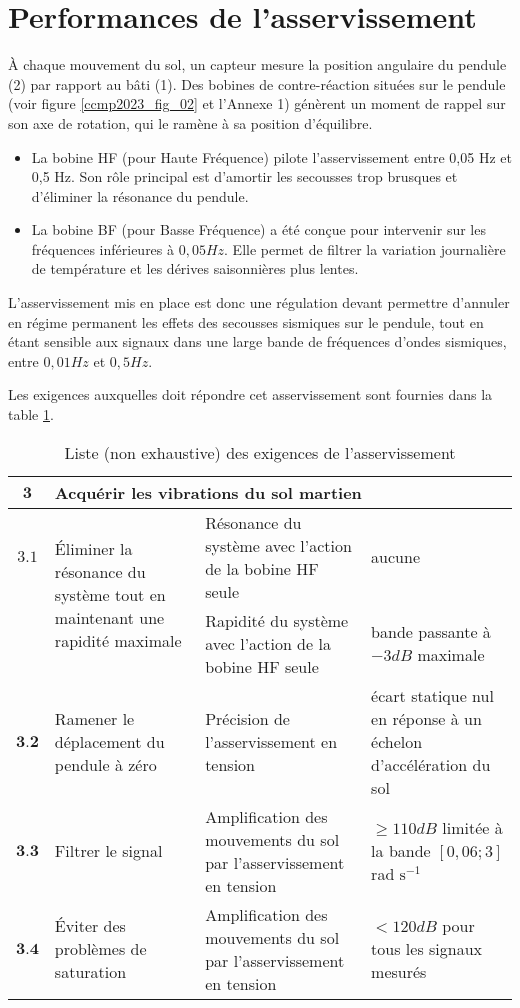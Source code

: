 \section{Performances de l'asservissement}
À chaque mouvement du sol, un capteur mesure la position angulaire du pendule (2) par rapport au bâti (1). Des bobines de contre-réaction situées sur le pendule (voir figure \ref{ccmp2023_fig_02} et l'Annexe 1) génèrent un moment de rappel sur son axe de rotation, qui le ramène à sa position d'équilibre.

\begin{itemize}
  \item La bobine HF (pour Haute Fréquence) pilote l'asservissement entre 0,05 Hz et 0,5 Hz. Son rôle principal est d'amortir les secousses trop brusques et d'éliminer la résonance du pendule.
  \item La bobine BF (pour Basse Fréquence) a été conçue pour intervenir sur les fréquences inférieures à $0,05 \si{Hz}$. Elle permet de filtrer la variation journalière de température et les dérives saisonnières plus lentes.
\end{itemize}

L'asservissement mis en place est donc une régulation devant permettre d'annuler en régime permanent les effets des secousses sismiques sur le pendule, tout en étant sensible aux signaux dans une large bande de fréquences d'ondes sismiques, entre $0,01 \si{Hz}$ et $0,5 \si{Hz}$.

Les exigences auxquelles doit répondre cet asservissement sont fournies dans la table \ref{ccmp2023_tab_03}.

\begin{table}[!h]
\centering
\begin{tabular}{cp{5cm}p{5cm}p{5cm}}
\hline
$\mathbf{3}$ & \multicolumn{3}{l}{Acquérir les vibrations du sol martien}  \\
\hline
$\mathbf{3.1}$ &\multirow{2}{4cm}{Éliminer la résonance du système tout en maintenant une rapidité maximale}&
Résonance du système avec l'action de la bobine HF seule &  aucune \\
\cline { 3 - 4 }
& & Rapidité du système avec l'action de la bobine HF seule & bande passante à $-3 \si{dB}$ maximale \\
\hline
$\mathbf{3 . 2}$ & 
Ramener le déplacement du pendule à zéro 
& Précision de l'asservissement en tension & écart statique nul en réponse à un échelon d'accélération du sol \\
\hline
$\mathbf{3 . 3}$ & Filtrer le signal & Amplification des mouvements du sol par l'asservissement en tension & 
$\geq 110 \si{dB}$ limitée à la bande $[0,06 ; 3]$ \si{rad} $\mathrm{s}^{-1}$ \\
\hline
$\mathbf{3 . 4}$ & Éviter des problèmes de saturation & Amplification des mouvements du sol par l'asservissement en tension 
&$<120 \si{dB}$ pour tous les signaux mesurés \\
\hline
\end{tabular}
\caption{\label{ccmp2023_tab_03}  Liste (non exhaustive) des exigences de l'asservissement}
\end{table}



